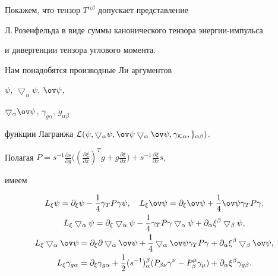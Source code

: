 Покажем, что тензор $T^{\alpha\beta}$  допускает представление


Л.\,Розенфельда в виде суммы канонического тензора энергии-импульса


и дивергенции тензора углового момента.





Нам понадобятся производные Ли аргументов


$\psi$, $\bigtriangledown_\alpha\psi$, $\ov\psi$,


$\bigtriangledown_\alpha\ov\psi$, $\gamma_{g\alpha}$, $g_{\alpha\beta}$


функции Лагранжа $\cal L(\psi,\bigtriangledown_\alpha\psi, \ov\psi


\bigtriangledown_\alpha\ov\psi, \gamma_{K\alpha}, g_{\alpha\beta})$.


Полагая $P=s^{-1}\frac{\partial s}{\partial g}\big(


(\frac{\partial \xi}{\partial x})^Tg+g\frac{\partial \xi}


{\partial x}\big)+s^{-1}\frac{\partial \xi}{\partial x}s$,


имеем


\begin{gather*}


L_\xi\psi=\partial_ \xi\psi-\frac{1}{4}\gamma_TP\gamma\psi,\quad


L_\xi\ov\psi= \partial_ \xi\ov\psi+\frac{1}{4}\ov\psi\gamma_TP\gamma,\\


%


L_\xi\bigtriangledown_\alpha\psi=\partial_ \xi


\bigtriangledown_\alpha\psi-\frac{1}{4}\gamma_TP\gamma


\bigtriangledown_\alpha\psi+\partial_ \alpha\xi^\beta


\bigtriangledown_\beta\psi,\\


%


L_\xi\bigtriangledown_\alpha\ov\psi=\partial_ \xi\partial


\bigtriangledown_\alpha\ov\psi+\frac{1}{4}\bigtriangledown_\alpha


\ov\psi\gamma_TP\gamma+\partial_ \alpha\xi^\beta


\bigtriangledown_\beta\ov\psi, \\


%


L_\xi\gamma_{g\alpha}= \partial_ \xi\gamma_{g\alpha}+


\frac{1}{2}(s^{-1}{})^\beta_\alpha(P_{\beta\nu}\gamma^\nu-


P^\mu_\beta\gamma_\mu)+\partial_ \alpha\xi^\beta\gamma_{g\beta}.


\end{gather*}


